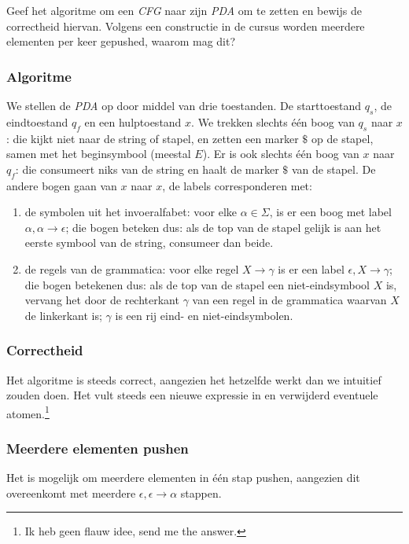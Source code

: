 \begin{quest}
Geef het algoritme om een \emph{CFG} naar zijn \emph{PDA} om te zetten en bewijs de correctheid hiervan.
Volgens een constructie in de cursus worden meerdere elementen per keer gepushed, waarom mag dit?
\end{quest}

\subsubsection*{Algoritme}

We stellen de \emph{PDA} op door middel van drie toestanden. De starttoestand $q_s$, de eindtoestand $q_f$ en een hulptoestand $x$. We trekken slechts \'e\'en boog van $q_s$ naar $x$: die kijkt niet naar de string of stapel, en zetten een marker $\$$ op de stapel, samen met het beginsymbool (meestal $E$). Er is ook slechts \'e\'en boog van $x$ naar $q_f$: die consumeert niks van de string en haalt de marker $\$$ van de stapel. De andere bogen gaan van $x$ naar $x$, de labels corresponderen met:
\begin{enumerate}
	\item de symbolen uit het invoeralfabet: voor elke $\alpha \in \Sigma$, is er een boog met label $\alpha, \alpha \rightarrow \epsilon$; die bogen beteken dus: als de top van de stapel gelijk is aan het eerste symbool van de string, consumeer dan beide.
	\item de regels van de grammatica: voor elke regel $X \rightarrow \gamma$ is er een label $\epsilon,X \rightarrow \gamma$; die bogen betekenen dus: als de top van de stapel een niet-eindsymbool $X$ is, vervang het door de rechterkant $\gamma$ van een regel in de grammatica waarvan $X$ de linkerkant is; $\gamma$ is een rij eind- en niet-eindsymbolen.
\end{enumerate}

\subsubsection*{Correctheid}

Het algoritme is steeds correct, aangezien het hetzelfde werkt dan we intuitief zouden doen. Het vult steeds een nieuwe expressie in en verwijderd eventuele atomen.\footnote{Ik heb geen flauw idee, send me the answer.}

\subsubsection*{Meerdere elementen pushen}

Het is mogelijk om meerdere elementen in \'e\'en stap pushen, aangezien dit overeenkomt met meerdere $\epsilon, \epsilon \rightarrow \alpha$ stappen.

